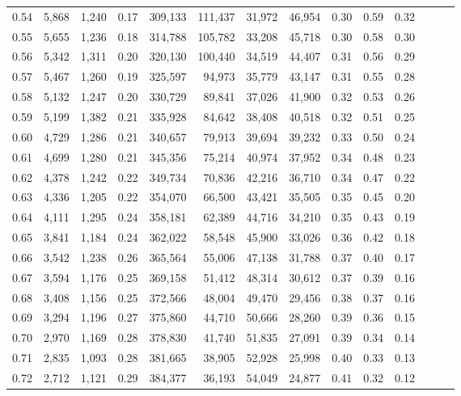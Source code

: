 \begin{tabular}{rrrrrrrrrrrrrr}
0.54 &  5,868 &  1,240 &  0.17 &  309,133 &  111,437 &  31,972 &  46,954 &  0.30 &  0.59 &      0.32 \\
0.55 &  5,655 &  1,236 &  0.18 &  314,788 &  105,782 &  33,208 &  45,718 &  0.30 &  0.58 &      0.30 \\
0.56 &  5,342 &  1,311 &  0.20 &  320,130 &  100,440 &  34,519 &  44,407 &  0.31 &  0.56 &      0.29 \\
0.57 &  5,467 &  1,260 &  0.19 &  325,597 &   94,973 &  35,779 &  43,147 &  0.31 &  0.55 &      0.28 \\
0.58 &  5,132 &  1,247 &  0.20 &  330,729 &   89,841 &  37,026 &  41,900 &  0.32 &  0.53 &      0.26 \\
0.59 &  5,199 &  1,382 &  0.21 &  335,928 &   84,642 &  38,408 &  40,518 &  0.32 &  0.51 &      0.25 \\
0.60 &  4,729 &  1,286 &  0.21 &  340,657 &   79,913 &  39,694 &  39,232 &  0.33 &  0.50 &      0.24 \\
0.61 &  4,699 &  1,280 &  0.21 &  345,356 &   75,214 &  40,974 &  37,952 &  0.34 &  0.48 &      0.23 \\
0.62 &  4,378 &  1,242 &  0.22 &  349,734 &   70,836 &  42,216 &  36,710 &  0.34 &  0.47 &      0.22 \\
0.63 &  4,336 &  1,205 &  0.22 &  354,070 &   66,500 &  43,421 &  35,505 &  0.35 &  0.45 &      0.20 \\
0.64 &  4,111 &  1,295 &  0.24 &  358,181 &   62,389 &  44,716 &  34,210 &  0.35 &  0.43 &      0.19 \\
0.65 &  3,841 &  1,184 &  0.24 &  362,022 &   58,548 &  45,900 &  33,026 &  0.36 &  0.42 &      0.18 \\
0.66 &  3,542 &  1,238 &  0.26 &  365,564 &   55,006 &  47,138 &  31,788 &  0.37 &  0.40 &      0.17 \\
0.67 &  3,594 &  1,176 &  0.25 &  369,158 &   51,412 &  48,314 &  30,612 &  0.37 &  0.39 &      0.16 \\
0.68 &  3,408 &  1,156 &  0.25 &  372,566 &   48,004 &  49,470 &  29,456 &  0.38 &  0.37 &      0.16 \\
0.69 &  3,294 &  1,196 &  0.27 &  375,860 &   44,710 &  50,666 &  28,260 &  0.39 &  0.36 &      0.15 \\
0.70 &  2,970 &  1,169 &  0.28 &  378,830 &   41,740 &  51,835 &  27,091 &  0.39 &  0.34 &      0.14 \\
0.71 &  2,835 &  1,093 &  0.28 &  381,665 &   38,905 &  52,928 &  25,998 &  0.40 &  0.33 &      0.13 \\
0.72 &  2,712 &  1,121 &  0.29 &  384,377 &   36,193 &  54,049 &  24,877 &  0.41 &  0.32 &      0.12 \\

\end{tabular}
